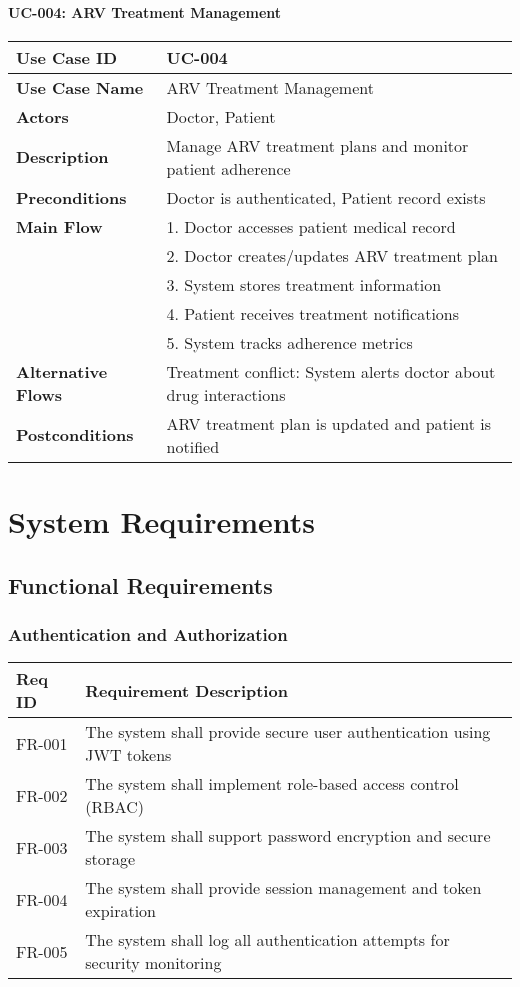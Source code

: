 \documentclass[12pt,a4paper]{article}
\begin{document}
\paragraph{UC-004: ARV Treatment Management}
\begin{longtable}{|p{3cm}|p{11cm}|}
\hline
\textbf{Use Case ID} & UC-004 \\
\hline
\textbf{Use Case Name} & ARV Treatment Management \\
\hline
\textbf{Actors} & Doctor, Patient \\
\hline
\textbf{Description} & Manage ARV treatment plans and monitor patient adherence \\
\hline
\textbf{Preconditions} & Doctor is authenticated, Patient record exists \\
\hline
\textbf{Main Flow} & 1. Doctor accesses patient medical record\\
& 2. Doctor creates/updates ARV treatment plan\\
& 3. System stores treatment information\\
& 4. Patient receives treatment notifications\\
& 5. System tracks adherence metrics \\
\hline
\textbf{Alternative Flows} & Treatment conflict: System alerts doctor about drug interactions \\
\hline
\textbf{Postconditions} & ARV treatment plan is updated and patient is notified \\
\hline
\end{longtable}

\section{System Requirements}

\subsection{Functional Requirements}

\subsubsection{Authentication and Authorization}
\begin{longtable}{|p{2cm}|p{12cm}|}
\hline
\textbf{Req ID} & \textbf{Requirement Description} \\
\hline
FR-001 & The system shall provide secure user authentication using JWT tokens \\
\hline
FR-002 & The system shall implement role-based access control (RBAC) \\
\hline
FR-003 & The system shall support password encryption and secure storage \\
\hline
FR-004 & The system shall provide session management and token expiration \\
\hline
FR-005 & The system shall log all authentication attempts for security monitoring \\
\hline
\end{longtable}
\end{document}
